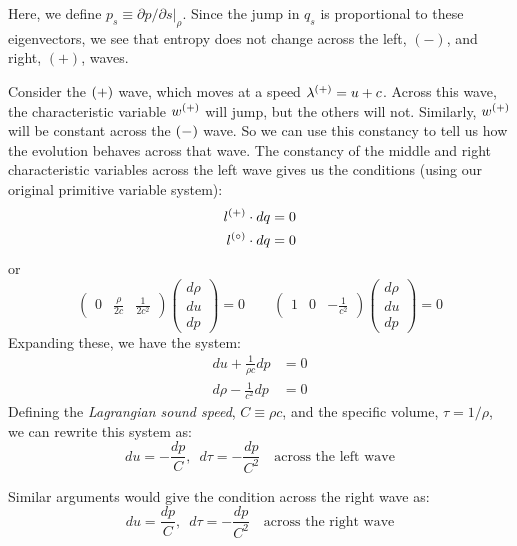 Here, we define $p_s \equiv \partial p/\partial s |_\rho$.
Since the jump in $q_s$ is proportional to these eigenvectors, we see that
entropy does not change across the left, $(-)$, and right, $(+)$, waves.

Consider the ${(+)}$ wave, which moves at a speed $\lambda^{(+)} = u
+c$.  Across this wave, the characteristic variable $w^{(+)}$ will
jump, but the others will not.  Similarly, $w^{(+)}$ will be constant
across the ${(-)}$ wave.  So we can use this constancy to tell us how
the evolution behaves across that wave.  The constancy of the middle and right characteristic variables across the left
wave gives us the conditions (using our original primitive variable system):
\begin{align}
l^{(+)} \cdot dq &= 0 \\
l^{(\circ)} \cdot dq &= 0 
\end{align}
or 
\begin{equation}
\left ( \begin{array}{ccc} 0 & \frac{\rho}{2c} & \frac{1}{2c^2} \end{array} \right)
   \left ( \begin{array}{c} d\rho \\ du \\ dp \end{array} \right ) = 0
\qquad
%
\left ( \begin{array}{ccc} 1 & 0 & -\frac{1}{c^2} \end{array} \right)
   \left ( \begin{array}{c} d\rho \\ du \\ dp \end{array} \right ) = 0
\end{equation}
Expanding these, we have the system:
\begin{align}
du + \frac{1}{\rho c} dp &= 0 \\
d\rho - \frac{1}{c^2} dp &= 0 
\end{align}
Defining the {\em Lagrangian sound speed}, $C \equiv \rho c$, and the 
specific volume, $\tau = 1/\rho$, we can rewrite this system as:
\begin{equation}
du = -\frac{dp}{C} , \,\,\, d\tau = -\frac{dp}{C^2} \quad \mbox{across the left wave}
\end{equation}

Similar arguments would give the condition across the right wave as:
\begin{equation}
du = \frac{dp}{C} , \,\,\, d\tau = -\frac{dp}{C^2} \quad \mbox{across the right wave}
\end{equation}

